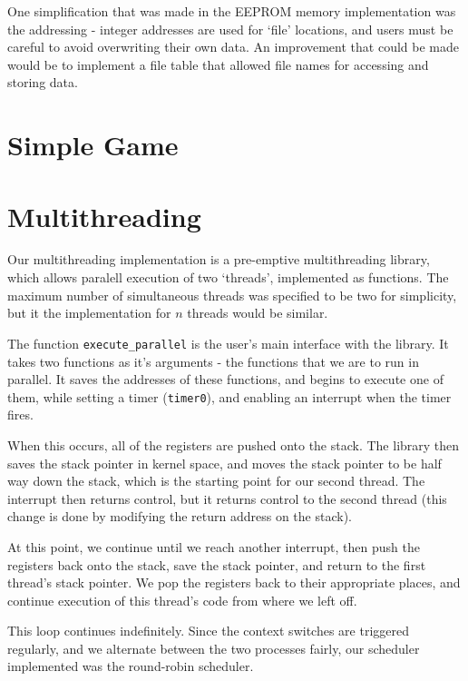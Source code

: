 \documentclass[twoside,a4paper]{article}
\begin{document}
One simplification that was made in the EEPROM memory implementation was the addressing - integer addresses are used for `file' locations, and users must be careful to avoid overwriting their own data. An improvement that could be made would be to implement a file table that allowed file names for accessing and storing data.
\section*{Simple Game}

\section*{Multithreading}
Our multithreading implementation is a pre-emptive multithreading library, which allows paralell execution of two `threads', implemented as functions. The maximum number of simultaneous threads was specified to be two for simplicity, but it the implementation for $n$ threads would be similar.

The function \texttt{execute\_parallel} is the user's main interface with the library. It takes two functions as it's arguments - the functions that we are to run in parallel. It saves the addresses of these functions, and begins to execute one of them, while setting a timer (\texttt{timer0}), and enabling an interrupt when the timer fires.

When this occurs, all of the registers are pushed onto the stack. The library then saves the stack pointer in kernel space, and moves the stack pointer to be half way down the stack, which is the starting point for our second thread. The interrupt then returns control, but it returns control to the second thread (this change is done by modifying the return address on the stack).

At this point, we continue until we reach another interrupt, then push the registers back onto the stack, save the stack pointer, and return to the first thread's stack pointer. We pop the registers back to their appropriate places, and continue execution of this thread's code from where we left off.

This loop continues indefinitely. Since the context switches are triggered regularly, and we alternate between the two processes fairly, our scheduler implemented was the round-robin scheduler.
\end{document}
